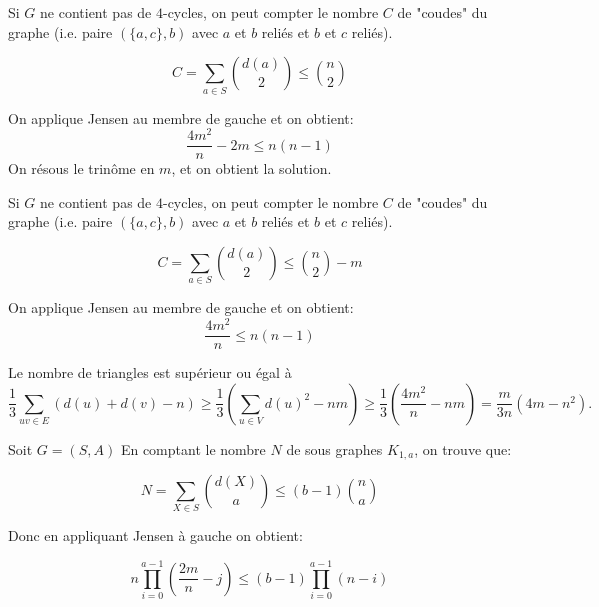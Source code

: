 \begin{sol}
Si $G$ ne contient pas de $4$-cycles, on peut compter le nombre $C$ de "coudes" du graphe (i.e. paire $(\{a,c\},b)$ avec $a$ et $b$ reliés et $b$ et $c$ reliés).

$$C=\sum_{a\in S}{d(a) \choose 2}\leq {n \choose 2}$$ 

On applique Jensen au membre de gauche et on obtient:
$$\frac{4m^2}{n}-2m\leq n(n-1) $$
On résous le trinôme en $m$, et on obtient la solution.
\end{sol}

\begin{sol}
Si $G$ ne contient pas de $4$-cycles, on peut compter le nombre $C$ de "coudes" du graphe (i.e. paire $(\{a,c\},b)$ avec $a$ et $b$ reliés et $b$ et $c$ reliés).

$$C=\sum_{a\in S}{d(a) \choose 2}\leq {n \choose 2}-m$$ 

On applique Jensen au membre de gauche et on obtient:
$$\frac{4m^2}{n}\leq n(n-1) $$

\end{sol}

\begin{sol} Le nombre de triangles est supérieur ou égal à 
$$\frac{1}{3}\sum_{uv\in E}(d(u) + d(v) - n) \geq \frac{1}{3}\left(\sum_{u\in V} d(u)^2 - nm\right) \geq \frac{1}{3}\left(\frac{4m^2}{n} - nm\right) = \frac{m}{3n}\left(4m - n^2\right).$$
\end{sol}

\begin{sol}

 Soit $G=(S,A)$ En comptant le nombre $N$ de sous graphes $K_{1,a}$, on trouve que:

$$N=\sum_{X\in S}{d(X) \choose a}\leq (b-1){n \choose a}$$

Donc en appliquant Jensen à gauche on obtient:

$$n\prod_{i=0}^{a-1} (\frac{2m}{n}-j)\leq (b-1)\prod_{i=0}^{a-1} (n-i)$$  
\end{sol}


